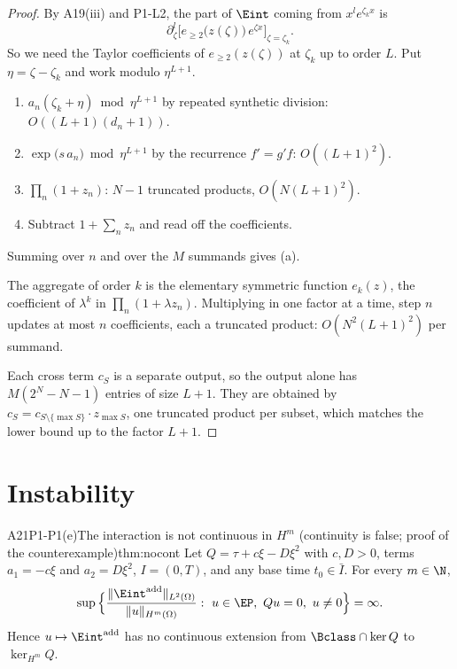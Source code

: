 \begin{proof}
By A19(iii) and P1-L2, the part of $\Eint$ coming from $x^le^{\zeta_kx}$ is
\[
\partial_\zeta^l\Big[e_{\ge2}\big(z(\zeta)\big)\,e^{\zeta x}\Big]_{\zeta=\zeta_k}.
\]
So we need the Taylor coefficients of $e_{\ge2}(z(\zeta))$ at $\zeta_k$ up to order $L$. Put $\eta=\zeta-\zeta_k$ and work modulo $\eta^{L+1}$.

\begin{enumerate}[label=(\arabic*)]
\item $a_n(\zeta_k+\eta)\bmod\eta^{L+1}$ by repeated synthetic division: $O((L+1)(d_n+1))$.
\item $\exp\big(s\,a_n\big)\bmod\eta^{L+1}$ by the recurrence $f'=g'f$: $O((L+1)^2)$.
\item $\prod_n(1+z_n)$: $N-1$ truncated products, $O(N(L+1)^2)$.
\item Subtract $1+\sum_nz_n$ and read off the coefficients.
\end{enumerate}
Summing over $n$ and over the $M$ summands gives (a).

The aggregate of order $k$ is the elementary symmetric function $e_k(z)$, the coefficient of $\lambda^k$ in $\prod_n(1+\lambda z_n)$. Multiplying in one factor at a time, step $n$ updates at most $n$ coefficients, each a truncated product: $O(N^2(L+1)^2)$ per summand.

Each cross term $c_S$ is a separate output, so the output alone has $M(2^N-N-1)$ entries of size $L+1$. They are obtained by $c_S=c_{S\setminus\{\max S\}}\cdot z_{\max S}$, one truncated product per subset, which matches the lower bound up to the factor $L+1$.

\end{proof}

\section{Instability}

\begin{dimcard}{A21}{P1-P1(e)}{The interaction is not continuous in $H^m$}{\falsest{} (continuity is false; proof of the counterexample)}{thm:nocont}
\label{dim:P1-P1e}%
Let $Q=\tau+c\xi-D\xi^2$ with $c,D>0$, terms $a_1=-c\xi$ and $a_2=D\xi^2$, $I=(0,T)$, and any base time $t_0\in\bar I$. For every $m\in\N$,
\[
\sup\Big\{\frac{\|\Eint^{\mathrm{add}}\|_{L^2(\Omega)}}{\|u\|_{H^m(\Omega)}}:\ u\in\EP,\ Qu=0,\ u\ne0\Big\}=\infty .
\]
Hence $u\mapsto\Eint^{\mathrm{add}}$ has no continuous extension from $\Bclass\cap\ker Q$ to $\ker_{H^m}Q$.
\end{dimcard}

